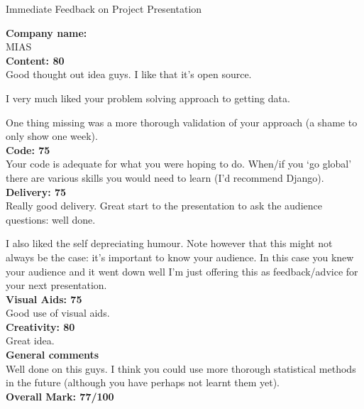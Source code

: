 \documentclass{article}
\begin{document}
\begin{center}
\Huge{Immediate Feedback on Project Presentation}\\
\end{center}


\normalsize
\textbf{Company name:}\\

MIAS \\

\textbf{Content: 80}\\

Good thought out idea guys.
I like that it's open source.

I very much liked your problem solving approach to getting data.

One thing missing was a more thorough validation of your approach (a shame to only show one week).\\

\textbf{Code: 75}\\

Your code is adequate for what you were hoping to do.
When/if you `go global' there are various skills you would need to learn (I'd recommend Django).\\

\textbf{Delivery: 75}\\

Really good delivery.
Great start to the presentation to ask the audience questions: well done.

I also liked the self depreciating humour.
Note however that this might not always be the case: it's important to know your audience.
In this case you knew your audience and it went down well I'm just offering this as feedback/advice for your next presentation.\\

\textbf{Visual Aids: 75}\\

Good use of visual aids.\\

\textbf{Creativity: 80}\\

Great idea.\\


\textbf{General comments}\\

Well done on this guys.
I think you could use more thorough statistical methods in the future (although you have perhaps not learnt them yet).\\

\textbf{Overall Mark: 77/100}
\end{document}
